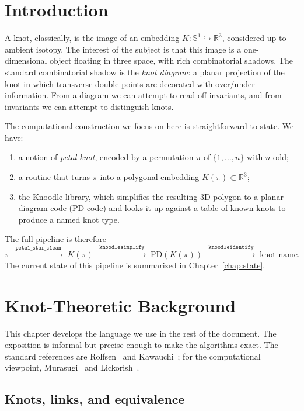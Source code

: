 \documentclass[11pt,oneside]{report}
\theoremstyle{definition}
\newcommand{\R}{\mathbb{R}}
\newcommand{\bbS}{\mathbb{S}}
\newcommand{\PD}{\mathrm{PD}}
\begin{document}
\mainmatter
{}

\chapter{Introduction}\label{chap:intro}

A knot, classically, is the image of an embedding $K \colon \bbS^1 \hookrightarrow
\R^3$, considered up to ambient isotopy. The interest of the subject is that
this image is a one-dimensional object floating in three space, with rich
combinatorial shadows. The standard combinatorial shadow is the
\emph{knot diagram}: a planar projection of the knot in which transverse
double points are decorated with over/under information. From a diagram we
can attempt to read off invariants, and from invariants we can attempt to
distinguish knots.

The computational construction we focus on here is straightforward to state.
We have:
\begin{enumerate}[label=(\roman*)]
\item a notion of \emph{petal knot}, encoded by a permutation $\pi$ of $\{1, \dots, n\}$ with $n$ odd;
\item a routine that turns $\pi$ into a polygonal embedding $K(\pi) \subset \R^3$;
\item the Knoodle library, which simplifies the resulting 3D polygon to a
planar diagram code (PD code) and looks it up against a table of known knots
to produce a named knot type.
\end{enumerate}
The full pipeline is therefore
\[
\pi \;\xrightarrow{\;\texttt{petal\_star\_clean}\;}\; K(\pi)
     \;\xrightarrow{\;\texttt{knoodlesimplify}\;}\; \PD(K(\pi))
     \;\xrightarrow{\;\texttt{knoodleidentify}\;}\; \text{knot name}.
\]
The current state of this pipeline is summarized in Chapter~\ref{chap:state}.

\chapter{Knot-Theoretic Background}\label{chap:background}

This chapter develops the language we use in the rest of the document. The
exposition is informal but precise enough to make the algorithms exact. The
standard references are Rolfsen~\cite{Rolfsen} and Kawauchi~\cite{Kawauchi};
for the computational viewpoint, Murasugi~\cite{Murasugi} and Lickorish~\cite{Lickorish}.

\section{Knots, links, and equivalence}
\end{document}
